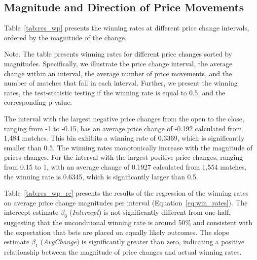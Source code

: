 \documentclass[webpdf,modern,medium]{oup-authoring-template}
\newcommand*\InputTable[1]{}
\theoremstyle{thmstyleone}%
\theoremstyle{thmstyletwo}%
\theoremstyle{thmstylethree}%
\begin{document}
    \subsection{Magnitude and Direction of Price Movements}

        Table~\ref{tab:res_wp} presents the winning rates at different price change intervals, ordered by the magnitude of the change.
        \begin{table}[htb]
            \caption{Winning Rates at Different Price Change Magnitudes}
            \label{tab:res_wp}
            \resizebox{\textwidth}{!}{
                \begin{tabular}{crrrrrr}
                    \toprule
                    \InputTable{res_wp}
                \end{tabular}
                }
            \begin{minipage}{\linewidth}Note. The  table presents winning rates for different price changes sorted by magnitudes. Specifically, we illustrate the price change interval, the average change within an interval, the average number of price movements, and the number of matches that fall in each interval. Further, we present the winning rates, the test-statistic testing if the winning rate is equal to 0.5, and the corresponding p-value.
            \end{minipage}
        \end{table}
        The interval with the largest negative price changes from the open to the close, ranging from -1 to -0.15, has an average price change of -0.192 calculated from 1,484 matches. This bin exhibits a winning rate of 0.3369, which is significantly smaller than 0.5. The winning rates monotonically increase with the magnitude of prices changes. For the interval with the largest positive price changes, ranging from 0.15 to 1, with an average change of 0.1927 calculated from 1,554 matches, the winning rate is 0.6345, which is significantly larger than 0.5.

        Table~\ref{tab:res_wp_re} presents the results of the regression of the winning rates on average price change magnitudes per interval (Equation~\eqref{eq:win_rates}).
        The intercept estimate $\beta_0$ (\textit{Intercept}) is not significantly different from one-half, suggesting that the unconditional winning rate is around 50\% and consistent with the expectation that bets are placed on equally likely outcomes. The slope estimate $\beta_1$ (\textit{AvgChange}) is significantly greater than zero, indicating a positive relationship between the magnitude of price changes and actual winning rates.
\end{document}
